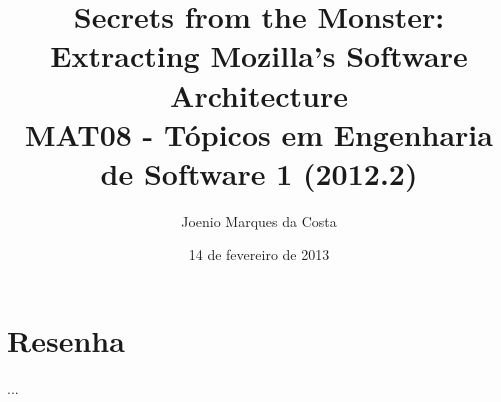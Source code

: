 \documentclass[12pt]{article}
\title{Secrets from the Monster: Extracting Mozilla’s Software Architecture
 \cite{SecretsFromMonster} \\
 \large MAT08 - Tópicos em Engenharia de Software 1 (2012.2)}
\author{Joenio Marques da Costa}
\date{14 de fevereiro de 2013}
\begin{document}
\maketitle

\section*{Resenha}

...


\end{document}
